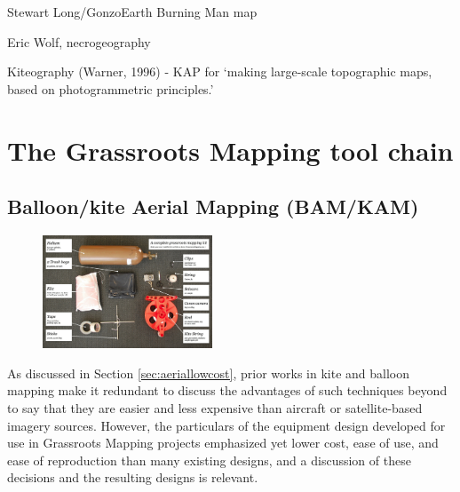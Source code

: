 \documentclass[11pt]{report}
\begin{document}
Stewart Long/GonzoEarth Burning Man map

Eric Wolf, necrogeography

Kiteography (Warner, 1996) - KAP for `making large-scale topographic maps, based on photogrammetric principles.' \cite{vierling2006short}

\chapter{The Grassroots Mapping tool chain}
\label{chap:toolchain}

\section{Balloon/kite Aerial Mapping (BAM/KAM)}

\begin{figure}
	\begin{flushright}
		\includegraphics[width=0.45\textwidth]{images/100-dollar-satellite-poster.jpg}
	\end{flushright}
\end{figure}

As discussed in Section \ref{sec:aeriallowcost}, prior works in kite and balloon mapping make it redundant to discuss the advantages of such techniques beyond to say that they are easier and less expensive than aircraft or satellite-based imagery sources. However, the particulars of the equipment design developed for use in Grassroots Mapping projects emphasized yet lower cost, ease of use, and ease of reproduction than many existing designs, and a discussion of these decisions and the resulting designs is relevant. 
\end{document}
